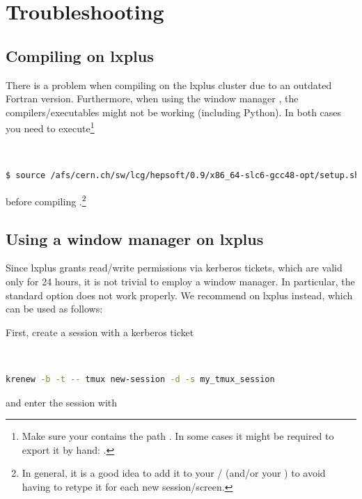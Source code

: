 \documentclass[english,11pt]{article}
\begin{document}
\gdef\thesection{Appendix \Alph{section}}
\section{Troubleshooting}\label{app:Troubleshooting}
\gdef\thesection{\Alph{section}}

\lstset{language=,
backgroundcolor=,
basicstyle=,
keywordstyle=,
stringstyle=,
commentstyle=,
frame=
}

\subsection{Compiling on lxplus}
There is a problem when compiling \OpenLoops{} on the lxplus cluster due to an outdated Fortran version. Furthermore, when 
using the window manager , the compilers/executables might not be working (including Python). In both cases you need to execute\footnote{Make sure your 
 contains the path . In some cases it might be required to 
export it by hand: .}
{\tt
\begin{lstlisting}[language=bash]
 $ source /afs/cern.ch/sw/lcg/hepsoft/0.9/x86_64-slc6-gcc48-opt/setup.sh
\end{lstlisting}
}%
before compiling \OpenLoops{}.\footnote{In general, it is a good idea to 
add it to your / (and/or your ) to avoid having to retype it for each new session/screen.}

\subsection{Using a window manager on lxplus}
Since lxplus grants read/write permissions via kerberos tickets, which 
are valid only for 24 hours, it is 
not trivial to employ a window manager. In particular, the 
standard option  does not work properly. We 
recommend  on lxplus instead, which can be 
used as follows:

First, create a session with a kerberos ticket
{\tt
\begin{lstlisting}[language=bash]
krenew -b -t -- tmux new-session -d -s my_tmux_session
\end{lstlisting}
}%
and enter the session with 
\end{document}
